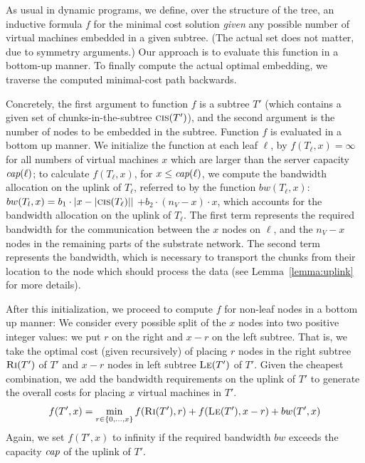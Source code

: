 \documentclass[9pt]{sigcomm-alternate}
\newcommand{\carlo}[1]{\textcolor{red}{carlo: #1}}
\newcommand{\ChunkCount}{\ensuremath{\textsc{cis}}}
\newcommand{\capacity}{\emph{cap}}
\newcommand{\Tree}{\ensuremath{T}}
\newcommand{\CostTrans}{\ensuremath{b_1}}
\newcommand{\CostCom}{\ensuremath{b_2}}
\newcommand{\Vms}{\ensuremath{n_V}}
\begin{document}
As usual in dynamic programs, we define, over the structure of the tree, an inductive formula $f$ for
the minimal cost solution \emph{given} any possible number of virtual
machines embedded in a given subtree. (The actual set does not matter,
due to symmetry arguments.)
Our approach is to evaluate this function in a bottom-up
manner.
To finally compute the actual optimal embedding,
we traverse the computed minimal-cost path backwards.

Concretely, the first argument to function $f$
is a subtree $\Tree'$ (which contains a given set of chunks-in-the-subtree $\ChunkCount(\Tree')$),
and the
second argument is the number of nodes to be embedded in the subtree.
Function $f$ is evaluated in a bottom up manner. We initialize the
function at each leaf $\ell$, by $f(T_{\ell},x) =
\infty$ for all numbers of virtual machines $x$ which are larger than
the server capacity $\capacity(\ell)$;
to calculate $f(T_{\ell}, x)$, for $x \leq \capacity(\ell)$, we compute the
bandwidth allocation on the uplink of $T_{\ell}$, referred to by the function
$bw(T_{\ell},x)$: $bw(T_l,x)=  \CostTrans \cdot |x - |\ChunkCount(T_{\ell})||$ $
+ \CostCom \cdot (\Vms - x) \cdot x$,
which accounts for the bandwidth allocation on the uplink of $T_{\ell}$. The first
term represents the required bandwidth for the communication between the $x$
nodes on $\ell$, and the $\Vms - x$ nodes in the remaining parts of the substrate
network. 
The second term represents
the bandwidth, which is necessary to transport the chunks from their location to
the node which should process the data (see Lemma~\ref{lemma:uplink} for more
details). 

After this initialization, we proceed to compute $f$ for non-leaf
nodes in a bottom up manner: We consider every possible split of the $x$ nodes
into two positive integer
values: we put $r$ on the right and $x - r$ on the left subtree. 
That is, we take the optimal cost
(given recursively) of placing $r$ nodes in
the right subtree $\textsc{Ri}(T')$ of $T'$ and $x-r$ nodes in left subtree $\textsc{Le}(T')$ of
$T'$. Given the cheapest combination, we add the bandwidth requirements
on the uplink of $T'$ to generate the overall costs for placing $x$ virtual
machines in $T'$.
$$f(T',x) =   \min_{r \in \{0, \ldots, x\}}  f(\textsc{Ri}(T'), r) +
f(\textsc{Le}(T'), x - r) + bw(T',x)$$
Again, we set $f(T',x)$ to infinity if the required bandwidth
$bw$ exceeds the capacity $\capacity$ of the uplink of $T'$.
\end{document}
